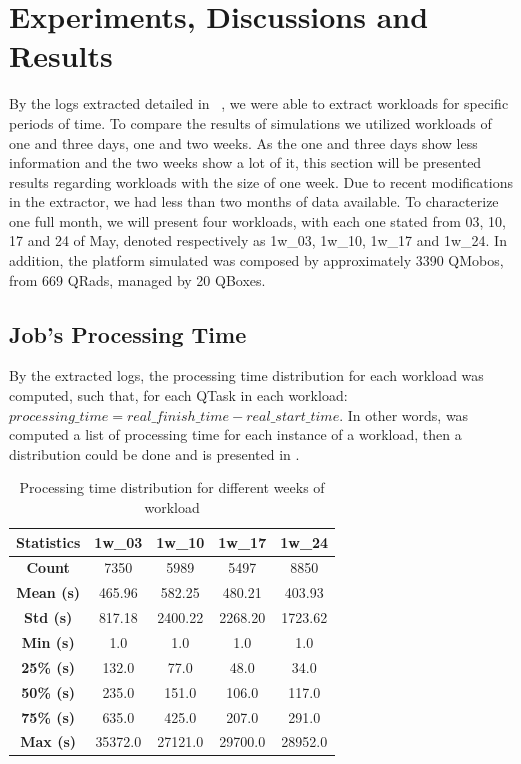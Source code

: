 \chapter{Experiments, Discussions and Results}
\label{sec:experiments}

By the logs extracted detailed in ~, we were able to extract workloads for specific periods of time. To compare the results of simulations we utilized workloads of one and three days, one and two weeks. As the one and three days show less information and the two weeks show a lot of it, this section will be presented results regarding workloads with the size of one week. Due to recent modifications in the extractor, we had less than two months of data available. To characterize one full month, we will present four workloads, with each one stated from 03, 10, 17 and 24 of May, denoted respectively as 1w\_03, 1w\_10, 1w\_17 and 1w\_24. In addition, the platform simulated was composed by approximately 3390 QMobos, from 669 QRads, managed by 20 QBoxes. 

\section{Job's Processing Time}
\label{sec:processing-time}

By the extracted logs, the processing time distribution for each workload was computed, such that, for each QTask in each workload: $processing\_time = real\_finish\_time - real\_start\_time$. In other words, was computed a list of processing time for each instance of a workload, then a distribution could be done and is presented in .

\begin{table}
\begin{center}
\caption{Processing time distribution for different weeks of workload}
\label{tab:processing-time}
\begin{tabular}{|c|c|c|c|c|}
    \toprule
    \textbf{Statistics} & \textbf{1w\_03} & \textbf{1w\_10} & \textbf{1w\_17} & \textbf{1w\_24} \\ \midrule
    \textbf{Count} &	7350 & 5989 & 5497 & 8850 \\ \midrule
    \textbf{Mean (s)}& 465.96 & 582.25 & 480.21 & 403.93 \\ \midrule
    \textbf{Std (s)} & 817.18 & 2400.22 & 2268.20 & 1723.62 \\ \midrule
    \textbf{Min (s)} & 1.0 & 1.0 & 1.0 & 1.0 \\ \midrule
    \textbf{25\% (s)} & 132.0 & 77.0 & 48.0 & 34.0 \\ \midrule
    \textbf{50\% (s)} & 235.0 & 151.0 & 106.0 & 117.0 \\ \midrule
    \textbf{75\% (s)} & 635.0 & 425.0 & 207.0 & 291.0 \\ \midrule
    \textbf{Max (s)} & 35372.0 & 27121.0 & 29700.0 & 28952.0 \\ \midrule
    \bottomrule
\end{tabular}
\end{center}
\end{table}

